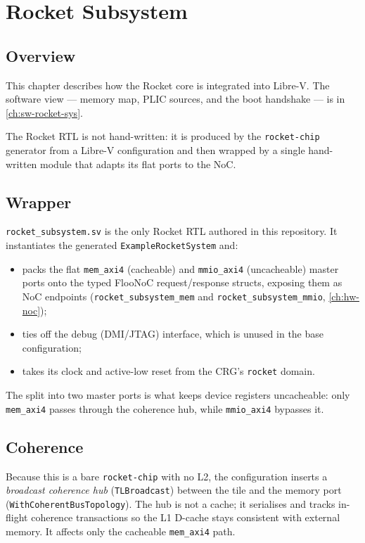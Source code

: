 \chapter{Rocket Subsystem}\label{ch:hw-rocket-sys}

\section{Overview}
This chapter describes how the Rocket core is integrated into Libre-V. The software view --- memory
map, PLIC sources, and the boot handshake --- is in \autoref{ch:sw-rocket-sys}.

The Rocket RTL is not hand-written: it is produced by the \texttt{rocket-chip} generator from a Libre-V
configuration and then wrapped by a single hand-written module that adapts its flat ports to the NoC.

\section{Wrapper}
\texttt{rocket\_subsystem.sv} is the only Rocket RTL authored in this repository. It instantiates the
generated \texttt{ExampleRocketSystem} and:
\begin{itemize}[nosep]
  \item packs the flat \texttt{mem\_axi4} (cacheable) and \texttt{mmio\_axi4} (uncacheable) master ports
        onto the typed FlooNoC request/response structs, exposing them as NoC endpoints
        (\texttt{rocket\_subsystem\_mem} and \texttt{rocket\_subsystem\_mmio}, \autoref{ch:hw-noc});
  \item ties off the debug (DMI/JTAG) interface, which is unused in the base configuration;
  \item takes its clock and active-low reset from the CRG's \texttt{rocket} domain.
\end{itemize}
The split into two master ports is what keeps device registers uncacheable: only \texttt{mem\_axi4}
passes through the coherence hub, while \texttt{mmio\_axi4} bypasses it.

\section{Coherence}
Because this is a bare \texttt{rocket-chip} with no L2, the configuration inserts a \emph{broadcast
coherence hub} (\texttt{TLBroadcast}) between the tile and the memory port
(\texttt{WithCoherentBusTopology}). The hub is not a cache; it serialises and tracks in-flight coherence
transactions so the L1 D-cache stays consistent with external memory. It affects only the cacheable
\texttt{mem\_axi4} path.

